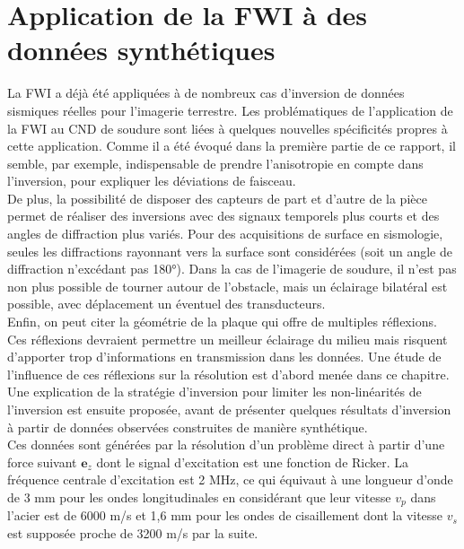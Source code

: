 \chapter{Application de la FWI à des données synthétiques \label{applications}}

La FWI a déjà été appliquées à de nombreux cas d'inversion de données sismiques réelles pour l'imagerie terrestre. Les problématiques de l'application de la FWI au CND de soudure sont liées à quelques nouvelles spécificités propres à cette application. Comme il a été évoqué dans la première partie de ce rapport, il semble, par exemple, indispensable de prendre l'anisotropie en compte dans l'inversion, pour expliquer les déviations de faisceau.\\

De plus, la possibilité de disposer des capteurs de part et d'autre de la pièce permet de réaliser des inversions avec des signaux temporels plus courts et des angles de diffraction plus variés. Pour des acquisitions de surface en sismologie, seules les diffractions rayonnant vers la surface sont considérées (soit un angle de diffraction n'excédant pas 180°). Dans la cas de l'imagerie de soudure, il n'est pas non plus possible de tourner autour de l'obstacle, mais un éclairage bilatéral est possible, avec déplacement un éventuel des transducteurs.\\

Enfin, on peut citer la géométrie de la plaque qui offre de multiples réflexions. Ces réflexions devraient permettre un meilleur éclairage du milieu mais risquent d'apporter trop d'informations en transmission dans les données. Une étude de l'influence de ces réflexions sur la résolution est d'abord menée dans ce chapitre. Une explication de la stratégie d'inversion pour limiter les non-linéarités de l'inversion est ensuite proposée, avant de présenter quelques résultats d'inversion à partir de données observées construites de manière synthétique.\\

Ces données sont générées par la résolution d'un problème direct à partir d'une force suivant $\bm{e}_{z}$ dont le signal d'excitation est une fonction de Ricker. La fréquence centrale d'excitation est 2 MHz,  ce qui équivaut à une longueur d'onde de 3 mm pour les ondes longitudinales en considérant que leur vitesse $v_{p}$ dans l'acier est de 6000 m/s et 1,6 mm pour les ondes de cisaillement dont la vitesse $v_{s}$ est supposée proche de 3200 m/s par la suite.

